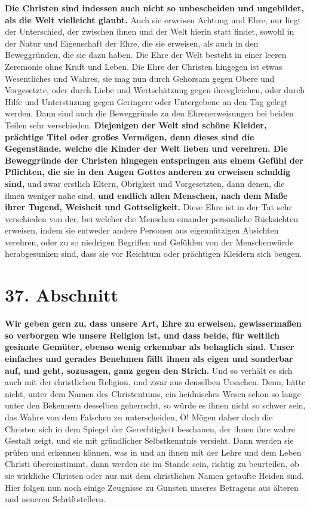 \textbf{Die Christen sind indessen auch nicht so unbescheiden und ungebildet,
als die
Welt vielleicht glaubt.} Auch sie erweisen Achtung und Ehre, nur liegt der
Unterschied, der zwischen ihnen und der Welt hierin statt findet, sowohl in der
Natur und Eigenschaft der Ehre, die sie erweisen, als auch in den Beweggründen,
die sie dazu haben. Die Ehre der Welt besteht in einer leeren Zeremonie ohne
Kraft und Leben. Die Ehre der Christen hingegen ist etwas Wesentliches und
Wahres, sie mag nun durch Gehorsam gegen Obere und Vorgesetzte, oder durch Liebe
und Wertschätzung gegen ihresgleichen, oder durch Hilfe und Unterstüzung gegen
Geringere oder Untergebene an den Tag gelegt werden. Dann sind auch die
Beweggründe zu den Ehrenerweisungen bei beiden Teilen sehr verschieden.
\label{ref:09_36_ehre_erweisen} \textbf{Diejenigen der Welt sind schöne
Kleider, prächtige Titel oder großes
Vermögen, denn dieses sind die Gegenstände, welche die Kinder der Welt
 lieben und
verehren. Die Beweggründe der Christen hingegen entspringen aus einem Gefühl
der Pflichten, die sie in den Augen Gottes anderen zu erweisen schuldig sind,}
und
zwar erstlich Eltern, Obrigkeit und Vorgesetzten, dann denen, die ihnen
weniger nahe sind, \textbf{und endlich allen Menschen, nach dem Maße ihrer
Tugend,
Weisheit und Gottseligkeit.} Diese
Ehre ist in der Tat sehr verschieden von der,
bei welcher die Menschen einander persönliche Rücksichten erweisen, indem
sie
entweder andere Personen aus eigennützigen Absichten verehren, oder zu so
niedrigen Begriffen und Gefühlen von der Menschenwürde herabgesunken sind, dass
sie
vor Reichtum oder prächtigen Kleidern sich beugen.

\section{37. Abschnitt} \label{kap9_ab37}

\label{ref:09_37_ehre_erweisen} \textbf{Wir geben gern zu, dass unsere Art,
Ehre zu erweisen, gewissermaßen so verborgen
wie unsere Religion ist, und dass beide, für weltlich
gesinnte
Gemüter, ebenso
wenig erkennbar als behaglich sind. Unser einfaches und gerades Benehmen fällt
ihnen als eigen und sonderbar auf, und geht, sozusagen, ganz gegen den Strich.}
Und so verhält es sich auch mit der christlichen Religion, und zwar aus
denselben Ursachen. Denn, hätte nicht, unter dem Namen des Christentums, ein
heidnisches Wesen schon so lange unter den Bekennern desselben geherrscht, so
würde es ihnen nicht so schwer sein, das Wahre von dem Falschen zu
unterscheiden, O! Mögen daher doch die Christen sich in dem Spiegel der
Gerechtigkeit beschauen, der ihnen ihre wahre
Gestalt
 zeigt, und sie mit
gründlicher Selbstkenntnis versieht. Dann werden sie prüfen und erkennen
können, was in und an ihnen mit der Lehre und dem Leben Christi übereinstimmt,
dann werden sie im Stande sein, richtig zu beurteilen, ob sie wirkliche
Christen oder nur mit dem christlichen Namen getaufte
Heiden sind. Hier
folgen nun noch einige Zeugnisse zu Gunsten unseres Betragens aus älteren und
neueren Schriftstellern.

